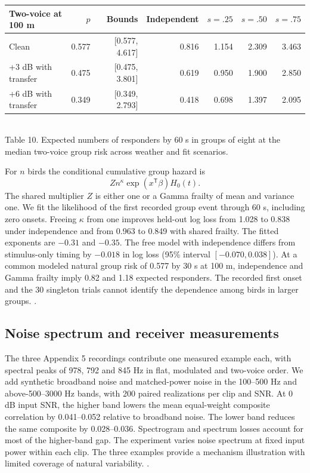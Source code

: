 {\begin{center}\small
\begin{tabular}{lrrrrrr}
\toprule
Two-voice at 100 m & $p$ & Bounds & Independent & $s=.25$ & $s=.50$ & $s=.75$\\
\midrule
Clean & 0.577 & [0.577, 4.617] & 0.816 & 1.154 & 2.309 & 3.463\\
+3 dB with transfer & 0.475 & [0.475, 3.801] & 0.619 & 0.950 & 1.900 & 2.850\\
+6 dB with transfer & 0.349 & [0.349, 2.793] & 0.418 & 0.698 & 1.397 & 2.095\\
\bottomrule
\end{tabular}\\[3pt]
Table 10. Expected numbers of responders by 60 s in groups of eight at the median two-voice group risk across weather and fit scenarios.
\end{center}

For $n$ birds the conditional cumulative group hazard is
\[
 Z n^\kappa\exp(x^\mathsf{T}\beta)H_0(t).
\]
The shared multiplier $Z$ is either one or a Gamma frailty of mean and variance one. We fit the likelihood of the first recorded group event through 60 s, including zero onsets. Freeing $\kappa$ from one improves held-out log loss from 1.028 to 0.838 under independence and from 0.963 to 0.849 with shared frailty. The fitted exponents are $-0.31$ and $-0.35$. The free model with independence differs from stimulus-only timing by $-0.018$ in log loss (95\% interval $[-0.070,0.038]$). At a common modeled natural group risk of 0.577 by 30 s at 100 m, independence and Gamma frailty imply 0.82 and 1.18 expected responders. The recorded first onset and the 30 singleton trials cannot identify the dependence among birds in larger groups. .

\subsection{Noise spectrum and receiver measurements}
The three Appendix 5 recordings contribute one measured example each, with spectral peaks of 978, 792 and 845 Hz in flat, modulated and two-voice order. We add synthetic broadband noise and matched-power noise in the 100--500 Hz and above-500--3000 Hz bands, with 200 paired realizations per clip and SNR. At 0 dB input SNR, the higher band lowers the mean equal-weight composite correlation by 0.041--0.052 relative to broadband noise. The lower band reduces the same composite by 0.028--0.036. Spectrogram and spectrum losses account for most of the higher-band gap. The experiment varies noise spectrum at fixed input power within each clip. The three examples provide a mechanism illustration with limited coverage of natural variability. .

}
